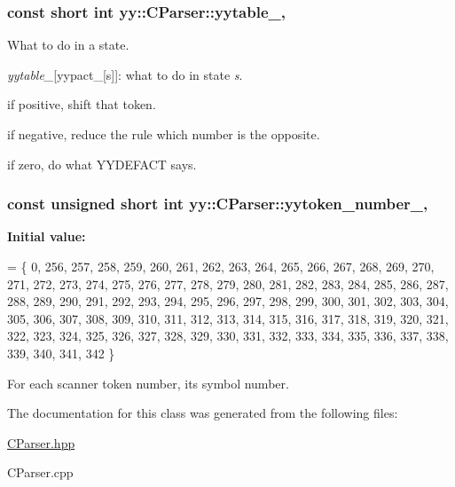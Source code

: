\hypertarget{classyy_1_1CParser_adfba95c609c457df4ccbdc21f936d4c4}{
\subsubsection[{yytable\-\_\-}]{\setlength{\rightskip}{0pt plus 5cm}const short int yy\-::\-C\-Parser\-::yytable\-\_\-\hspace{0.3cm}{\ttfamily [static]}, {\ttfamily [private]}}}\label{classyy_1_1CParser_adfba95c609c457df4ccbdc21f936d4c4}


What to do in a state. 

{\itshape yytable\-\_\-}\mbox{[}yypact\-\_\-\mbox{[}s\mbox{]}\mbox{]}\-: what to do in state {\itshape s}.
\begin{DoxyItemize}
\item if positive, shift that token.
\item if negative, reduce the rule which number is the opposite.
\item if zero, do what Y\-Y\-D\-E\-F\-A\-C\-T says. 
\end{DoxyItemize}\hypertarget{classyy_1_1CParser_af4038b8ba3f091e65529cb2a000f42ff}{
\subsubsection[{yytoken\-\_\-number\-\_\-}]{\setlength{\rightskip}{0pt plus 5cm}const unsigned short int yy\-::\-C\-Parser\-::yytoken\-\_\-number\-\_\-\hspace{0.3cm}{\ttfamily [static]}, {\ttfamily [private]}}}\label{classyy_1_1CParser_af4038b8ba3f091e65529cb2a000f42ff}
{\bfseries Initial value\-:}
\begin{DoxyCode}
=
  \{
         0,   256,   257,   258,   259,   260,   261,   262,   263,   264,
     265,   266,   267,   268,   269,   270,   271,   272,   273,   274,
     275,   276,   277,   278,   279,   280,   281,   282,   283,   284,
     285,   286,   287,   288,   289,   290,   291,   292,   293,   294,
     295,   296,   297,   298,   299,   300,   301,   302,   303,   304,
     305,   306,   307,   308,   309,   310,   311,   312,   313,   314,
     315,   316,   317,   318,   319,   320,   321,   322,   323,   324,
     325,   326,   327,   328,   329,   330,   331,   332,   333,   334,
     335,   336,   337,   338,   339,   340,   341,   342
  \}
\end{DoxyCode}


For each scanner token number, its symbol number. 



The documentation for this class was generated from the following files\-:\begin{DoxyCompactItemize}
\item 
\hyperlink{CParser_8hpp}{C\-Parser.\-hpp}\item 
C\-Parser.\-cpp\end{DoxyCompactItemize}
